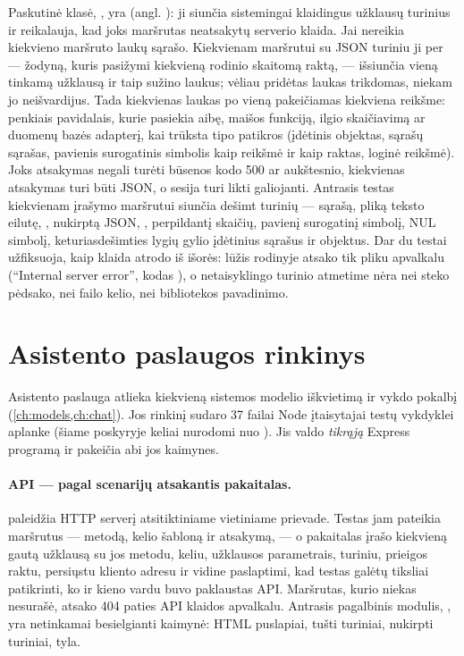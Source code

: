 Paskutinė klasė, , yra  (angl.
): ji siunčia sistemingai klaidingus užklausų turinius ir reikalauja, kad joks
maršrutas neatsakytų serverio klaida. Jai nereikia kiekvieno maršruto laukų sąrašo. Kiekvienam
maršrutui su JSON turiniu ji per  --- žodyną, kuris pasižymi kiekvieną rodinio
skaitomą raktą, --- išsiunčia vieną tinkamą užklausą ir taip sužino laukus; vėliau pridėtas laukas
trikdomas, niekam jo neišvardijus. Tada kiekvienas laukas po vieną pakeičiamas kiekviena
 reikšme: penkiais pavidalais, kurie pasiekia aibę, maišos funkciją, ilgio
skaičiavimą ar duomenų bazės adapterį, kai trūksta tipo patikros (įdėtinis objektas, sąrašų
sąrašas, pavienis surogatinis simbolis kaip reikšmė ir kaip raktas, loginė reikšmė). Joks
atsakymas negali turėti būsenos kodo 500 ar aukštesnio, kiekvienas atsakymas turi būti JSON, o sesija
turi likti galiojanti. Antrasis testas kiekvienam įrašymo maršrutui siunčia dešimt
 turinių --- sąrašą, pliką teksto eilutę, , nukirptą JSON, ,
perpildantį skaičių, pavienį surogatinį simbolį, NUL simbolį, keturiasdešimties lygių gylio
įdėtinius sąrašus ir objektus. Dar du testai užfiksuoja, kaip klaida atrodo iš išorės: lūžis
rodinyje atsako tik pliku apvalkalu (\enquote{Internal server error}, kodas
), o netaisyklingo turinio atmetime nėra nei steko pėdsako, nei failo kelio,
nei bibliotekos pavadinimo.


\section{Asistento paslaugos rinkinys}\label{sec:testing:assistant}

Asistento paslauga atlieka kiekvieną sistemos modelio iškvietimą ir vykdo pokalbį
(\cref{ch:models,ch:chat}). Jos rinkinį sudaro 37 failai Node įtaisytajai testų vykdyklei aplanke
 (šiame poskyryje keliai nurodomi nuo ). Jis valdo
\emph{tikrąją} Express programą ir pakeičia abi jos kaimynes.

\paragraph{API --- pagal scenarijų atsakantis pakaitalas.}  paleidžia
HTTP serverį atsitiktiniame vietiniame prievade. Testas jam pateikia maršrutus --- metodą, kelio
šabloną ir atsakymą, --- o pakaitalas įrašo kiekvieną gautą užklausą su jos metodu, keliu,
užklausos parametrais, turiniu, prieigos raktu, persiųstu kliento adresu ir vidine paslaptimi,
kad testas galėtų tiksliai patikrinti, ko ir kieno vardu buvo paklaustas API. Maršrutas, kurio
niekas nesurašė, atsako 404 paties API klaidos apvalkalu. Antrasis pagalbinis modulis,
, yra netinkamai besielgianti kaimynė: HTML puslapiai, tušti
turiniai, nukirpti turiniai, tyla.

